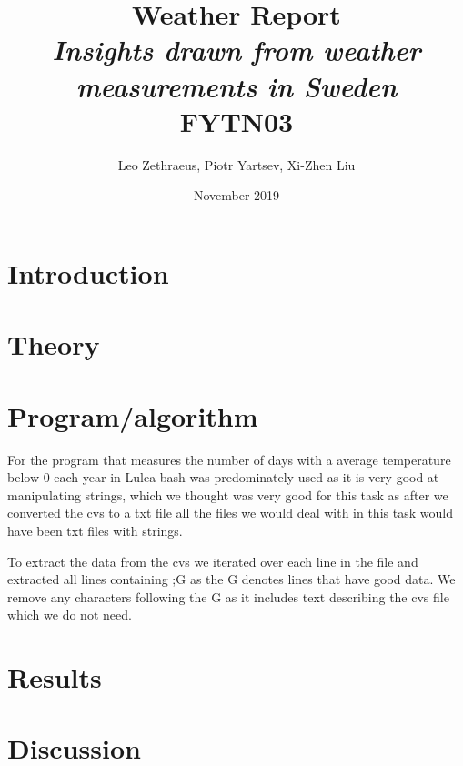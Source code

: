 \documentclass[a4paper]{article}
\begin{document}
\usepackage{graphicx}
\title{Weather Report\\\textit{Insights drawn from weather measurements in Sweden} \\ FYTN03}
\author{Leo Zethraeus, 
Piotr Yartsev, Xi-Zhen Liu} %
\date{November 2019} %
\maketitle
\newpage
\tableofcontents

\newpage

\section{Introduction}

\section{Theory}



\section{Program/algorithm}

For the program that measures the number of days with a average temperature below 0 each year in Lulea bash was predominately used as it is very good at manipulating strings,  which we thought was very good for this task as after we converted the cvs to a txt file all the files we would deal with in this task would have been txt files with strings.

To extract the data from the cvs we iterated over each line in the file and extracted all lines containing ;G as the G denotes lines that have good data. We remove any characters following the G as it includes text describing the cvs file which we do not need.  

\section{Results}
\section{Discussion}
\end{document}
